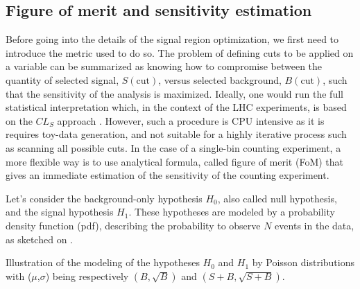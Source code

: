     \subsection{Figure of merit and sensitivity estimation \label{sec:FoMdiscussion}}

    Before going into the details of the signal region optimization, we first need to
    introduce the metric used to do so. The problem of defining cuts to be applied on a
    variable can be summarized as knowing how to compromise between the quantity of
    selected signal, $S(\text{cut})$, versus selected background, $B(\text{cut})$, such
    that the sensitivity of the analysis is maximized. Ideally, one would run the full
    statistical interpretation which, in the context of the LHC experiments, is based
    on the $CL_S$ approach \cite{CLs}. However, such a procedure is CPU intensive as it is
    requires toy-data generation, and not suitable for a highly iterative process such
    as scanning all possible cuts. In the case of a single-bin counting experiment, a more
    flexible way is to use analytical formula, called figure of merit (FoM) that gives an
    immediate estimation of the sensitivity of the counting experiment.

    Let's consider the background-only hypothesis $H_0$, also called null hypothesis,
    and the signal hypothesis $H_1$. These hypotheses are modeled by a probability density
    function (pdf), describing the probability to observe $N$ events in the data, as
    sketched on .

                 {Illustration of the modeling of the hypotheses $H_0$ and $H_1$
                 by Poisson distributions with ($\mu$,$\sigma$) being respectively
                 $(B,\sqrt{B})$ and $(S+B,\sqrt{S+B})$.}

